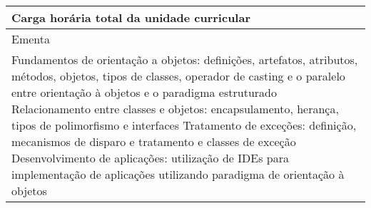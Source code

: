 \begin{quadro}[h!]
\begin{tabular}{|p{3cm} p{2cm} p{3cm} p{2cm} p{3cm} p{2cm}|}
\multicolumn{5}{|p{13cm}|}{\cellcolor{blue1} Carga horária total da unidade curricular} & \multicolumn{1}{p{1cm}|}{\raggedleft 90	}\\\hline
\multicolumn{6}{|p{15cm}|}{\cellcolor{blue1} Ementa} \\\hline
\hline\multicolumn{6}{|p{15cm}|}{\scriptsize Fundamentos de orientação a objetos: definições, artefatos, atributos, métodos, objetos, tipos de classes, operador de casting e o paralelo entre orientação à objetos e o paradigma estruturado Relacionamento entre classes e objetos: encapsulamento, herança, tipos de polimorfismo e interfaces Tratamento de exceções: definição, mecanismos de disparo e tratamento e classes de exceção Desenvolvimento de aplicações: utilização de IDEs para implementação de aplicações utilizando paradigma de orientação à objetos}\\\hline
\hline
	\end{tabular}
\end{quadro}
